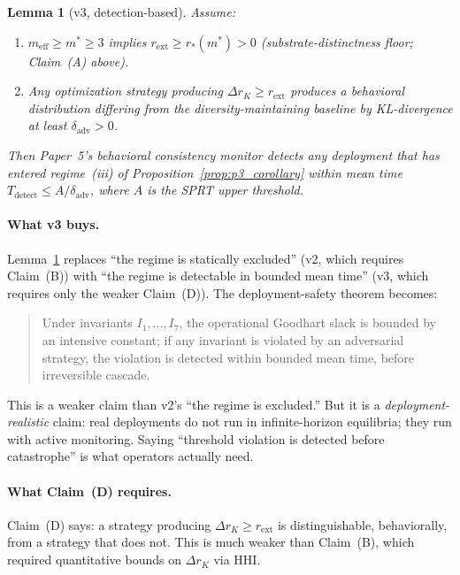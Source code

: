 \documentclass{article}
\newtheorem{lemma}{Lemma}
\newcommand{\rext}{r_{\mathrm{ext}}}
\newcommand{\meff}{m_{\mathrm{eff}}}
\begin{document}
\begin{lemma}[v3, detection-based]
\label{lem:v3}
Assume:
\begin{enumerate}
\item[(A)] $\meff \geq m^* \geq 3$ implies $\rext \geq r_*(m^*) > 0$
  (substrate-distinctness floor; Claim~(A) above).
\item[(D)] Any optimization strategy producing $\Delta r_K \geq \rext$
  produces a behavioral distribution differing from the
  diversity-maintaining baseline by KL-divergence at least
  $\delta_{\mathrm{adv}} > 0$.
\end{enumerate}
Then Paper~5's behavioral consistency monitor detects any deployment
that has entered regime~(iii) of
Proposition~\ref{prop:p3_corollary} within mean time $T_{\mathrm{detect}}
\leq A / \delta_{\mathrm{adv}}$, where $A$ is the SPRT upper threshold.
\end{lemma}

\paragraph{What v3 buys.}
Lemma~\ref{lem:v3} replaces ``the regime is statically excluded'' (v2,
which requires Claim~(B)) with ``the regime is detectable in bounded
mean time'' (v3, which requires only the weaker Claim~(D)).  The
deployment-safety theorem becomes:

\begin{quote}
Under invariants $I_1, \ldots, I_7$, the operational Goodhart slack is
bounded by an intensive constant; if any invariant is violated by an
adversarial strategy, the violation is detected within bounded mean
time, before irreversible cascade.
\end{quote}

This is a weaker claim than v2's ``the regime is excluded.''  But it is
a \emph{deployment-realistic} claim: real deployments do not run in
infinite-horizon equilibria; they run with active monitoring.  Saying
``threshold violation is detected before catastrophe'' is what
operators actually need.

\paragraph{What Claim~(D) requires.}
Claim~(D) says: a strategy producing $\Delta r_K \geq \rext$ is
distinguishable, behaviorally, from a strategy that does not.  This is
much weaker than Claim~(B), which required quantitative bounds on
$\Delta r_K$ via HHI.
\end{document}
